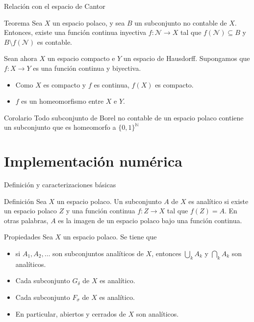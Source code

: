 \documentclass[8pt]{beamer}
\begin{document}
\begin{frame}{Relación con el espacio de Cantor}
    \begin{block}{Teorema}
        Sea $X$ un espacio polaco, y sea $B$ un subconjunto no contable de $X$. Entonces, existe una función continua inyectiva $f:\mathcal{N}\longrightarrow X$ tal que $f(\mathcal{N}) \subseteq B$ y $B\setminus f(\mathcal{N})$ es contable.
    \end{block}
    \vspace{0.35cm}
    \pause
    Sean ahora $X$ un espacio compacto e $Y$ un espacio de Hausdorff.
    Supongamos que $f:X \longrightarrow Y$ es una función continua y biyectiva. 
     \begin{itemize}
         \item Como $X$ es compacto y $f$ es continua, $f(X)$ es compacto.
         \item $f$ es un homeomorfismo entre $X$ e $Y$.
     \end{itemize} 
    \pause
    \vspace{0.35cm}
    \begin{block}{Corolario}
       Todo subconjunto de Borel no contable de un espacio polaco contiene un subconjunto que es homeomorfo a $\{0,1\}^\mathbb{N}$ 
    \end{block}
\end{frame}


\section{Implementación numérica}
\begin{frame}{Definición y caracterizaciones básicas}
    \begin{block}{Definición}
        Sea $X$ un espacio polaco. Un subconjunto $A$ de $X$ es analítico si existe un espacio polaco $Z$ y una función continua $f:Z \longrightarrow X$ tal que $f(Z)=A$. En otras palabras, $A$ es la imagen de un espacio polaco bajo una función continua.
    \end{block}
\pause
    \begin{block}{Propiedades}
         Sea $X$ un espacio polaco. Se tiene que
         \begin{itemize}
             \item si $A_1,A_2, \dots$ son subconjuntos analíticos de $X$, entonces  $\displaystyle \bigcup_k A_k$ y $\displaystyle \bigcap_k A_k$ son analíticos.
             \item Cada subconjunto $G_\delta$ de $X$ es analítico.
             \item Cada subconjunto $F_\sigma$ de $X$ es analítico.
         \end{itemize}
    \end{block}
    \pause
    \begin{itemize}
        \item En particular, abiertos y cerrados de $X$ son analíticos.
    \end{itemize}
\end{frame}
\end{document}
